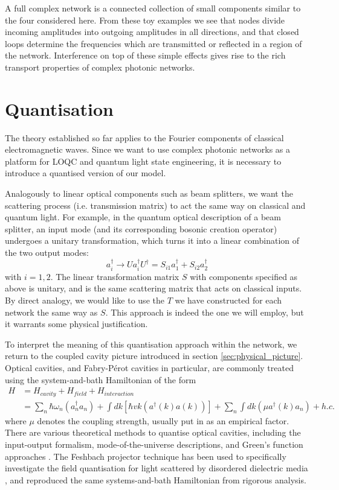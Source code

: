 A full complex network is a connected collection of small components similar to the four considered here. From these toy examples we see that nodes divide incoming amplitudes into outgoing amplitudes in all directions, and that closed loops determine the frequencies which are transmitted or reflected in a region of the network. Interference on top of these simple effects gives rise to the rich transport properties of complex photonic networks.  


\section{Quantisation}
The theory established so far applies to the Fourier components of classical electromagnetic waves. Since we want to use complex photonic networks as a platform for LOQC and quantum light state engineering, it is necessary to introduce a quantised version of our model.

Analogously to linear optical components such as beam splitters, we want the scattering process (i.e. transmission matrix) to act the same way on classical and quantum light. For example, in the quantum optical description of a beam splitter, an input mode (and its corresponding bosonic creation operator) undergoes a unitary transformation, which turns it into a linear combination of the two output modes:
\begin{equation}
    \label{eq:beamsplitter}
    a_i^\dagger \rightarrow Ua_i^\dagger U^\dagger = S_{i1}a_1^\dagger + S_{i2}a_2^\dagger
\end{equation}
with $i=1,2$. The linear transformation matrix $S$ with components specified as above is unitary, and is the same scattering matrix that acts on classical inputs. By direct analogy, we would like to use the $T$ we have constructed for each network the same way as $S$. This approach is indeed the one we will employ, but it warrants some physical justification.

To interpret the meaning of this quantisation approach within the network, we return to the coupled cavity picture introduced in section \ref{sec:physical_picture}. Optical cavities, and Fabry-P\'erot cavities in particular, are commonly treated using the system-and-bath Hamiltonian of the form \cite{Zandi2012}
\begin{align}
\label{eq:H_fabryperot}
        H &= H_{cavity} + H_{field} + H_{interaction}\\ \nonumber
          &= \sum_n \hbar\omega_n(a_n^\dagger a_n) + \int dk [\hbar vk  (a^\dagger(k)a(k))] + \sum_n\int dk (\mu a^\dagger(k)a_n) + h.c.
\end{align}
where $\mu$ denotes the coupling strength, usually put in as an empirical factor. There are various theoretical methods to quantise optical cavities, including the input-output formalism, mode-of-the-universe descriptions, and Green's function approaches \cite{Barlow2015}. The Feshbach projector technique has been used to specifically investigate the field quantisation for light scattered by disordered dielectric media \cite{Viviescas2003}, and reproduced the same systems-and-bath Hamiltonian from rigorous analysis. 

